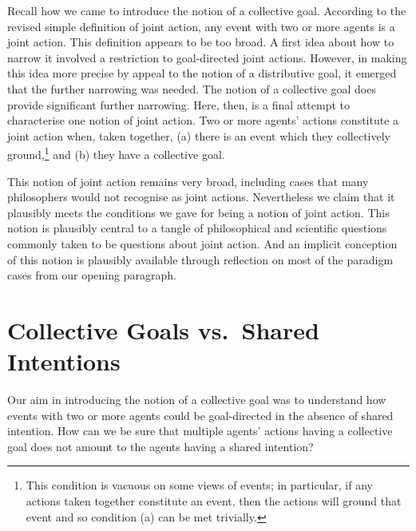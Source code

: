\documentclass[12pt,a4paper]{extarticle}
\begin{document}
Recall how we came to introduce the notion of a  collective goal.
According to the revised simple definition of joint action, any event with two or more agents is a joint action.
This definition appears to be too broad.
A first idea about how to narrow it involved a restriction to goal-directed joint actions.
However, in making this idea more precise by appeal to the notion of a distributive goal, it emerged that the further narrowing was needed.
The notion of a collective goal does provide significant further narrowing.
Here, then, is a final attempt to characterise one notion of joint action.
Two or more agents' actions constitute a joint action when, taken together, 
	(a) there is an event which they collectively ground,\footnote{
	This condition is vacuous on some views of events; in particular, if any actions taken together constitute an event, then the actions will ground that event and so condition (a) can be met trivially.
	}
	 and
	(b) they have a collective goal.

This notion of joint action remains very broad, including cases that many philosophers would not recognise as joint actions.
Nevertheless we claim that it plausibly meets the conditions we gave for being a notion of joint action.
This notion is plausibly
central to a tangle of philosophical and scientific questions commonly taken to be questions about joint action.
And an implicit conception of this notion is plausibly available through reflection on most of the paradigm cases from our opening paragraph.



\section{Collective Goals vs.\ Shared Intentions}
Our aim in  introducing the notion of a collective goal was to understand how events with two or more agents could be goal-directed in the absence of shared intention.  
How can we be sure that multiple agents' actions having a collective goal does not amount to the agents having a shared intention?
\end{document}
